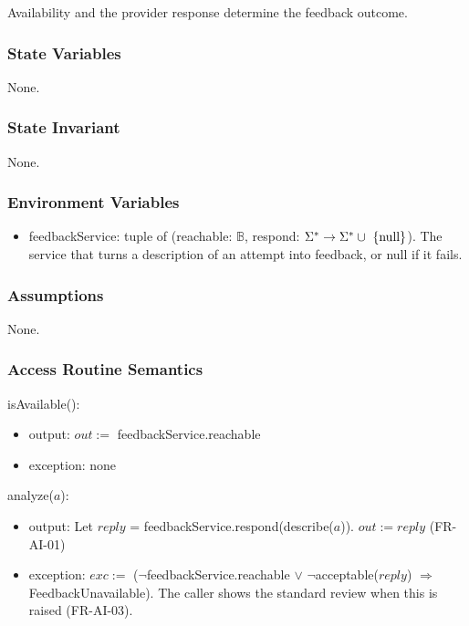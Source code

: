 \documentclass[12pt, titlepage]{article}
\newcommand{\nul}{\textnormal{null}}
\begin{document}
Availability and the provider response determine the feedback outcome.

\subsubsection{State Variables}

None.

\subsubsection{State Invariant}

None.

\subsubsection{Environment Variables}

\begin{itemize}
\item feedbackService: tuple of (reachable: $\mathbb{B}$, respond: $\Sigma^*
  \rightarrow \Sigma^* \cup \ \{\nul\}$). The service that turns a description
  of an attempt into feedback, or \nul{} if it fails.
\end{itemize}

\subsubsection{Assumptions}

None.

\subsubsection{Access Routine Semantics}

\noindent isAvailable():
\begin{itemize}
\item output: $out :=$ feedbackService.reachable
\item exception: none
\end{itemize}

\noindent analyze($a$):
\begin{itemize}
\item output: Let $reply$ = feedbackService.respond(describe($a$)). $out :=
  reply$ (FR-AI-01)
\item exception: $exc :=$ ($\neg$feedbackService.reachable $\vee$
  $\neg$acceptable($reply$) $\Rightarrow$ FeedbackUnavailable). The caller
  shows the standard review when this is raised (FR-AI-03).
\end{itemize}
\end{document}
